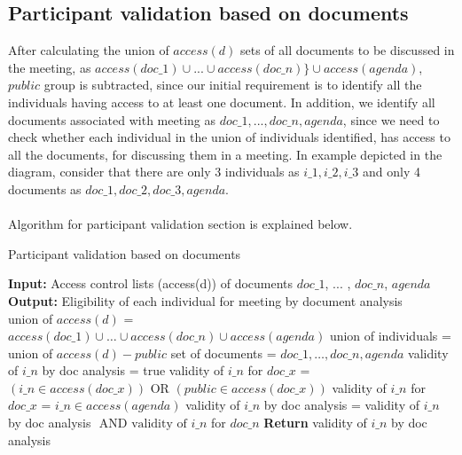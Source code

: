\subsection{Participant validation based on documents}
After calculating the union of $access(d)$ sets of all documents to be discussed in the meeting, as $access(doc\_1) \cup ... \cup access(doc\_n)\} \cup access(agenda)$, $public$ group is subtracted, since our initial requirement is to identify all the individuals having access to at least one document. In addition, we identify all documents associated with meeting as $doc\_1, ..., doc\_n, agenda$, since we need to check whether each individual in the union of individuals identified, has access to all the documents, for discussing them in a meeting. In example depicted in the diagram, consider that there are only 3 individuals as $i\_1, i\_2, i\_3$ and only 4 documents as $doc\_1, doc\_2, doc\_3, agenda$.\\ \\
Algorithm for participant validation section is explained below.
\begin{algorithm}[H]
    \caption{Participant validation based on documents}
    \begin{algorithmic}[1]
        \State \textbf{Input:} Access control lists (access(d)) of documents \(doc\_1\), ... , \(doc\_n\), \(agenda\)
        \State \textbf{Output:} Eligibility of each individual for meeting by document analysis \\
        \State union of \(access(d)\) = \(access(doc\_1) \cup \dots \cup access(doc\_n) \cup access(agenda)\)
        \State union of individuals = union of \(access(d) - public \)
        \State set of documents = \(doc\_1, \dots , doc\_n , agenda\)
            \State validity of \(i\_n\) by doc analysis = true
                    \State validity of \(i\_n\) for \(doc\_x\) = \((i\_n \in access(doc\_x)) \text{ OR } (public \in access(doc\_x))\)
                \Else
                    \State validity of \(i\_n\) for \(doc\_x\) = \(i\_n \in access(agenda)\)
                \EndIf
                \State validity of \(i\_n\) by doc analysis = validity of  \(i\_n\) by doc analysis \(\text{ AND validity of } i\_n\) for \(doc\_n\)
            \EndFor
            \State \textbf{Return} validity of \(i\_n\) by doc analysis
        \EndFor
    \end{algorithmic}
\end{algorithm}
